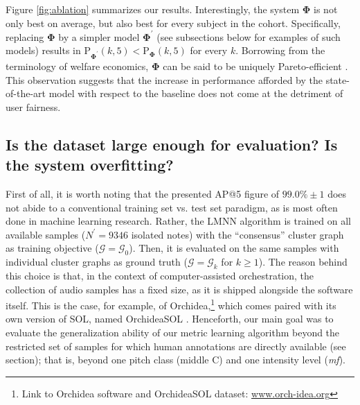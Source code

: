 \documentclass{bmcart}
\newcommand{\lnameref}[1]{%
\bgroup
\let\nmu\MakeLowercase
\nameref{#1}\egroup}
\newcommand{\nmu}{}
\begin{document}
Figure \ref{fig:ablation} summarizes our results.
Interestingly, the system $\boldsymbol{\Phi}$ is not only best on average, but also best for every subject in the cohort.
Specifically, replacing $\boldsymbol{\Phi}$ by a simpler model $\boldsymbol{\Phi}^{\prime}$ (see subsections below for examples of such models) results in $\mathrm{P}_{\mathbf{\Phi^\prime}}(k, 5) < \mathrm{P}_{\mathbf{\Phi}}(k, 5)$ for every $k$.
Borrowing from the terminology of welfare economics, $\boldsymbol{\Phi}$ can be said to be uniquely Pareto-efficient \cite{black2012dictionary}.
This observation suggests that the increase in performance afforded by the state-of-the-art model with respect to the baseline does not come at the detriment of user fairness.


\subsection*{Is the dataset large enough for evaluation? Is the system overfitting?}
First of all, it is worth noting that the presented AP@5 figure of $99.0\% \pm 1$ does not abide to a conventional training set vs. test set paradigm, as is most often done in machine learning research.
Rather, the LMNN algorithm is trained on all available samples ($N^{\prime}=9346$ isolated notes) with the ``consensus'' cluster graph as training objective ($\mathcal{G}=\mathcal{G}_0$).
Then, it is evaluated on the same samples with individual cluster graphs as ground truth ($\mathcal{G}=\mathcal{G}_k$ for $k\geq1$).
The reason behind this choice is that, in the context of computer-assisted orchestration, the collection of audio samples has a fixed size, as it is shipped alongside the software itself.
This is the case, for example, of Orchidea,\footnote{Link to Orchidea software and OrchideaSOL dataset: \url{www.orch-idea.org}} which comes paired with its own version of SOL, named OrchideaSOL \cite{cella2020icmc}.
Henceforth, our main goal was to evaluate the generalization ability of our metric learning algorithm beyond the restricted set of samples for which human annotations are directly available (see \lnameref{sec:data-collection} section); that is, beyond one pitch class (middle C) and one intensity level (\emph{mf}).
\end{document}
